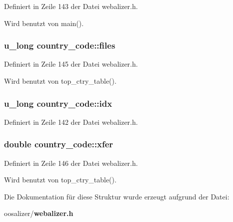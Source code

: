 Definiert in Zeile 143 der Datei webalizer.h.

Wird benutzt von main().
\subsubsection{\setlength{\rightskip}{0pt plus 5cm}u\_\-long {\bf country\_\-code::files}}\label{structcountry__code_ecff0cb1d546cd8375ca6ed45a75867c}




Definiert in Zeile 145 der Datei webalizer.h.

Wird benutzt von top\_\-ctry\_\-table().
\subsubsection{\setlength{\rightskip}{0pt plus 5cm}u\_\-long {\bf country\_\-code::idx}}\label{structcountry__code_8b77525096037f6830210dc03728c88a}




Definiert in Zeile 142 der Datei webalizer.h.
\subsubsection{\setlength{\rightskip}{0pt plus 5cm}double {\bf country\_\-code::xfer}}\label{structcountry__code_c2f451d6198d10eb266d7cdadf117a1e}




Definiert in Zeile 146 der Datei webalizer.h.

Wird benutzt von top\_\-ctry\_\-table().

Die Dokumentation f\"{u}r diese Struktur wurde erzeugt aufgrund der Datei:\begin{CompactItemize}
\item 
oosalizer/{\bf webalizer.h}\end{CompactItemize}

